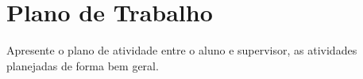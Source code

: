 


\section{Plano de Trabalho}
    \label{sec:plano-de-trabalho}
    
    Apresente o plano de atividade entre o aluno e supervisor, as atividades planejadas de forma bem geral.